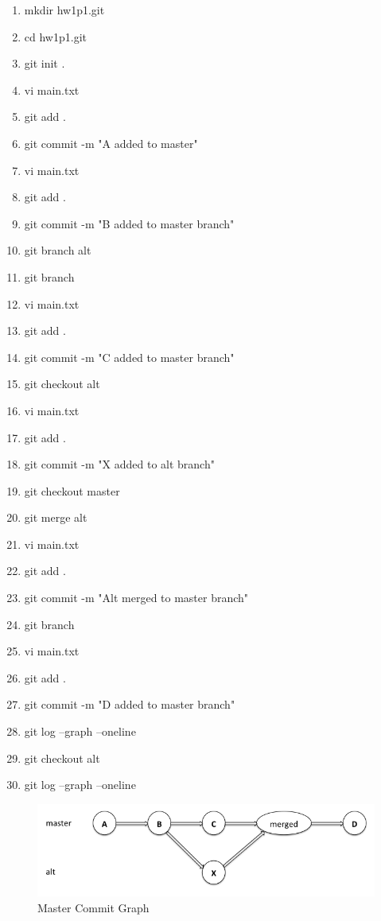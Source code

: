 \documentclass[12pt]{article}
\begin{document}
\begin{enumerate}
\item mkdir hw1p1.git 
\item cd hw1p1.git 
\item git init . 
\item vi main.txt
\item git add .
\item git commit -m "A added to master"
\item vi main.txt
\item git add .
\item git commit -m "B added to master branch"
\item git branch alt
\item git branch
\item vi main.txt
\item git add .
\item git commit -m "C added to master branch"
\item git checkout alt
\item vi main.txt
\item git add .
\item git commit -m "X added to alt branch"
\item git checkout master
\item git merge alt
\item vi main.txt
\item git add .
\item git commit -m "Alt merged to master branch"
\item git branch
\item vi main.txt
\item git add .
\item git commit -m "D added to master branch"
\item git log --graph --oneline
\item git checkout alt
\item git log --graph --oneline
\end{enumerate}

\begin{figure}[h]
    \begin{center}
        \includegraphics[width=\textwidth]{master_commitgraph.png}
    \end{center}
    \caption{Master Commit Graph}
    \label{fig:mcg}
\end{figure}
\end{document}

